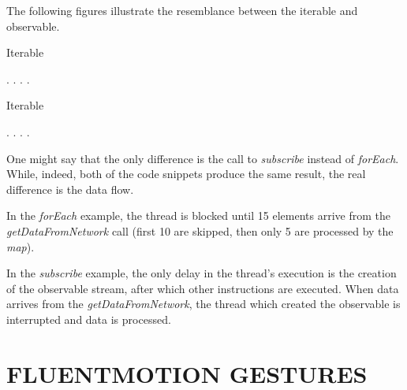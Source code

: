 \documentclass{sigchi}
\begin{document}
The following figures illustrate the resemblance between the iterable and observable.

\begin{algorithm}
  \label{algorithm.iterable}
  \caption{Iterable}
  \begin{algorithmic}
    \State {}
      \State .
      \State .
      \State .
      \State .
  \end{algorithmic}
\end{algorithm}


\begin{algorithm}
  \label{algorithm.Observable}
  \caption{Iterable}
  \begin{algorithmic}
    \State {}
      \State .
      \State .
      \State .
      \State .
  \end{algorithmic}
\end{algorithm}


One might say that the only difference is the call to \textit{subscribe} instead of \textit{forEach}. While, indeed, both of the code snippets produce the same result, the real difference is the data flow.


In the \textit{forEach} example, the thread is blocked until 15 elements arrive from the \textit{getDataFromNetwork} call (first 10 are skipped, then only 5 are processed by the \textit{map}).


In the \textit{subscribe} example, the only delay in the thread's execution is the creation of the observable stream, after which other instructions are executed. When data arrives from the \textit{getDataFromNetwork}, the thread which created the observable is interrupted and data is processed.


\section{FLUENTMOTION GESTURES}
\end{document}
